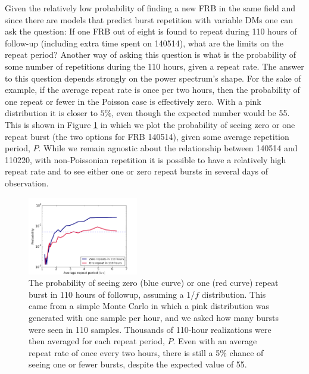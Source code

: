 \documentclass[useAMS,usenatbib]{mn2e}
\begin{document}
Given the relatively low probability of finding 
a new FRB in the same field and since there are models that predict
burst repetition with variable DMs \citep{2015arXiv150505535C, 2015arXiv150701002M}
one can ask the question: If one FRB out of eight is found to
repeat during 110 hours of follow-up (including extra time spent on 140514), 
what are the limits on the
repeat period? Another way of asking this question is what is the probability of 
 some number of repetitions during the 110 hours, given a repeat rate. The answer to 
this question depends strongly on the power spectrum's shape. For the sake of example, if the average 
repeat rate is once per two hours, then the probability of one repeat or fewer in the Poisson
case is effectively zero. With a pink distribution it is closer to $5\%$, even though 
the expected number would be 55. This is 
shown in Figure \ref{FIG-hist} in which we plot the probability of seeing zero or one repeat burst
(the two options for FRB 140514), given some average repetition period, $P$. While 
we remain agnostic about the relationship between 140514 and 110220, with 
non-Poissonian repetition it is possible to have a relatively high repeat rate 
and to see either one or zero repeat bursts in several days of observation. 


\begin{figure}
  \centering
   \includegraphics[trim={0in, 0in, 0in, 0in}, width=0.43\textwidth, height=0.3\textwidth]{repeat_rate_limit.png}
   \caption{The probability of seeing zero (blue curve) or one (red curve) repeat burst
   in 110 hours of followup, assuming a 1/$f$ distribution. This came 
   from a simple Monte Carlo in which a pink distribution was generated with one sample per hour, 
   and we asked how many bursts were seen in 110 samples. Thousands of 110-hour realizations
   were then averaged for each repeat period, $P$. 
   Even with an average 
   repeat rate of once every two hours, there is still a 5$\%$ chance of seeing one or
   fewer bursts, despite the expected value of 55.}
   \label{FIG-hist}
\end{figure}
\end{document}
